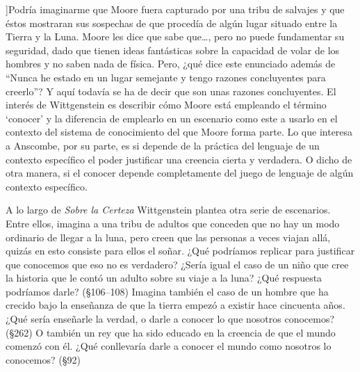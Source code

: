 ]{Podría imaginarme que Moore fuera capturado por una tribu de salvajes y que éstos mostraran sus sospechas de que procedía de algún lugar situado entre la Tierra y la Luna. Moore les dice que sabe que\ldots, pero no puede fundamentar su seguridad, dado que tienen ideas fantásticas sobre la capacidad de volar de los hombres y no saben nada de física. \textelp{} Pero, ¿qué dice este enunciado además de ``Nunca he estado en un lugar semejante y tengo razones concluyentes para creerlo''? Y aquí todavía se ha de decir que son unas razones concluyentes.}  El interés de Wittgenstein es describir cómo Moore está empleando el término `conocer' y la diferencia de emplearlo en un escenario como este a usarlo en el contexto del sistema de conocimiento del que Moore forma parte. Lo que interesa a Anscombe, por su parte, es si depende de la práctica del lenguaje de un contexto específico el poder justificar una creencia cierta y verdadera. O dicho de otra manera, si el conocer depende completamente del juego de lenguaje de algún contexto específico.

A lo largo de \emph{Sobre la Certeza} Wittgenstein plantea otra serie de escenarios. Entre ellos, imagina a una tribu de adultos que conceden que no hay un modo ordinario de llegar a la luna, pero creen que las personas a veces viajan allá, quizás en esto consiste para ellos el soñar. ¿Qué podríamos replicar para justificar que conocemos que eso no es verdadero? ¿Sería igual el caso de un niño que cree la historia que le contó un adulto sobre su viaje a la luna? ¿Qué respuesta podríamos darle? (\S106--108) Imagina también el caso de un hombre que ha crecido bajo la enseñanza de que la tierra empezó a existir hace cincuenta años. ¿Qué sería enseñarle la verdad, o darle a conocer lo que nosotros conocemos? (\S262) O también un rey que ha sido educado en la creencia de que el mundo comenzó con él. ¿Qué conllevaría darle a conocer el mundo como nosotros lo conocemos? (\S92)

